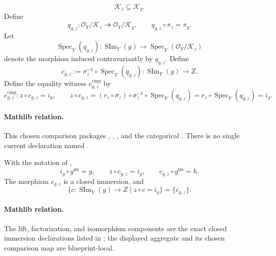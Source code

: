 \begin{definition}
  \[
    \mathcal K_z\subseteq\mathcal K_g.
  \]
  Define
  \[
    q_{g,z}\colon\mathcal O_Y/\mathcal K_z
      \twoheadrightarrow\mathcal O_Y/\mathcal K_g,
    \qquad
    q_{g,z}\circ\pi_z=\pi_g.
  \]
  Let
  \[
    \operatorname{Spec}_Y(q_{g,z})\colon
      \operatorname{SIm}_Y(g)\longrightarrow
      \operatorname{Spec}_Y(\mathcal O_Y/\mathcal K_z)
  \]
  denote the morphism induced contravariantly by $q_{g,z}$.  Define
  \[
    c_{g,z}:=\sigma_z^{-1}\circ\operatorname{Spec}_Y(q_{g,z})
      \colon\operatorname{SIm}_Y(g)\longrightarrow Z.
  \]
  Define the equality witness $e_{g,z}^{\mathrm{cmp}}$ by
  \[
    e_{g,z}^{\mathrm{cmp}}\colon z\circ c_{g,z}=i_g,
    \qquad
    z\circ c_{g,z}
      =(r_z\circ\sigma_z)\circ\sigma_z^{-1}
        \circ\operatorname{Spec}_Y(q_{g,z})
      =r_z\circ\operatorname{Spec}_Y(q_{g,z})
      =i_g.
  \]

  \paragraph{Mathlib relation.}
  This chosen comparison packages
  \texttt{},
  \texttt{},
  \texttt{}, and the categorical
  \texttt{}.  There is no single current
  declaration named
  \texttt{}.
\end{definition}

\begin{lemma}
  \label{lemma:nagata-scheme-image-universal}

  With the notation of
  ,
  \[
    i_g\circ g^{\mathrm{im}}=g,
    \qquad z\circ c_{g,z}=i_g,
    \qquad c_{g,z}\circ g^{\mathrm{im}}=h.
  \]
  The morphism $c_{g,z}$ is a closed immersion, and
  \[
    \{c\colon\operatorname{SIm}_Y(g)\to Z\mid z\circ c=i_g\}
      =\{c_{g,z}\}.
  \]

  \paragraph{Mathlib relation.}
  The lift, factorization, and isomorphism components are the exact closed
  immersion declarations listed in
  ; the displayed aggregate and its
  chosen comparison map are blueprint-local.
\end{lemma}

